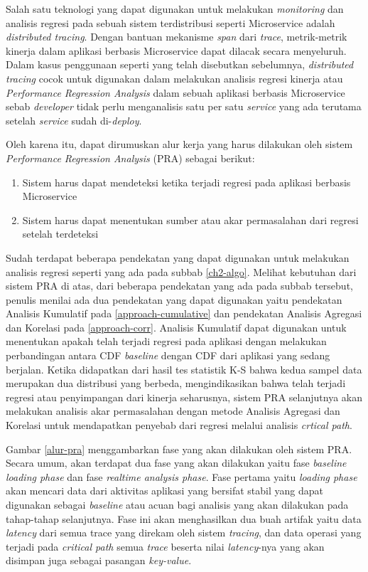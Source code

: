 Salah satu teknologi yang dapat digunakan untuk melakukan \textit{monitoring} dan analisis regresi pada sebuah sistem terdistribusi seperti Microservice adalah \textit{distributed tracing}. Dengan bantuan mekanisme \textit{span} dari \textit{trace}, metrik-metrik kinerja dalam aplikasi berbasis Microservice dapat dilacak secara menyeluruh. Dalam kasus penggunaan seperti yang telah disebutkan sebelumnya, \textit{distributed tracing} cocok untuk digunakan dalam melakukan analisis regresi kinerja atau \textit{Performance Regression Analysis} dalam sebuah aplikasi berbasis Microservice sebab \textit{developer} tidak perlu menganalisis satu per satu \textit{service} yang ada terutama setelah \textit{service} sudah di-\textit{deploy}.

Oleh karena itu, dapat dirumuskan alur kerja yang harus dilakukan oleh sistem \textit{Performance Regression Analysis} (PRA) sebagai berikut:
\begin{enumerate}
	\item Sistem harus dapat mendeteksi ketika terjadi regresi pada aplikasi berbasis Microservice
	\item Sistem harus dapat menentukan sumber atau akar permasalahan dari regresi setelah terdeteksi
\end{enumerate}

Sudah terdapat beberapa pendekatan yang dapat digunakan untuk melakukan analisis regresi seperti yang ada pada subbab \ref{ch2-algo}. Melihat kebutuhan dari sistem PRA di atas, dari beberapa pendekatan yang ada pada subbab tersebut, penulis menilai ada dua pendekatan yang dapat digunakan yaitu pendekatan Analisis Kumulatif pada \ref{approach-cumulative} dan pendekatan Analisis Agregasi dan Korelasi pada \ref{approach-corr}. Analisis Kumulatif dapat digunakan untuk menentukan apakah telah terjadi regresi pada aplikasi dengan melakukan perbandingan antara CDF \textit{baseline} dengan CDF dari aplikasi yang sedang berjalan. Ketika didapatkan dari hasil tes statistik K-S bahwa kedua sampel data merupakan dua distribusi yang berbeda, mengindikasikan bahwa telah terjadi regresi atau penyimpangan dari kinerja seharusnya, sistem PRA selanjutnya akan melakukan analisis akar permasalahan dengan metode Analisis Agregasi dan Korelasi untuk mendapatkan penyebab dari regresi melalui analisis \textit{crtical path}.

Gambar \ref{alur-pra} menggambarkan fase yang akan dilakukan oleh sistem PRA. Secara umum, akan terdapat dua fase yang akan dilakukan yaitu fase \textit{baseline loading phase} dan fase \textit{realtime analysis phase}. Fase pertama yaitu \textit{loading phase} akan mencari data dari aktivitas aplikasi yang bersifat stabil yang dapat digunakan sebagai \textit{baseline} atau acuan bagi analisis yang akan dilakukan pada tahap-tahap selanjutnya. Fase ini akan menghasilkan dua buah artifak yaitu data \textit{latency} dari semua trace yang direkam oleh sistem \textit{tracing}, dan data operasi yang terjadi pada \textit{critical path} semua \textit{trace} beserta nilai \textit{latency}-nya yang akan disimpan juga sebagai pasangan \textit{key-value}. 

